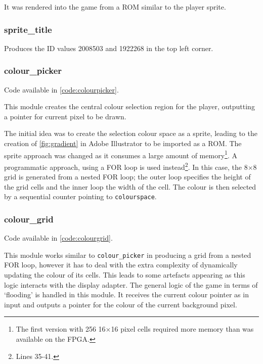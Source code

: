 It was rendered into the game from a ROM similar to the player sprite.

\subsubsection{sprite\_title}
Produces the ID values 2008503 and 1922268 in the top left corner. 

\subsubsection{colour\_picker}\label{sec:colourpicker}

Code available in \cref{code:colourpicker}.

This module creates the central colour selection region for the player, outputting 
a pointer for current pixel to be drawn.  

The initial idea was to create the selection colour space as a sprite, leading 
to the creation of \cref{fig:gradient} in Adobe Illustrator to be imported as a ROM. 
The sprite approach was changed as it consumes a large amount of memory\footnote{
    The first version with 256 16$\times$16 pixel cells required more memory than was available on the FPGA. 
}. 
A programmatic approach, using a FOR loop is used instead\footnote{
    Lines 35-41.
}. In this case, the 8$\times$8 grid is generated from a nested FOR loop; the 
outer loop specifies the height of the grid cells and the inner loop the width 
of the cell. The colour is then selected by a sequential counter 
pointing to \lstinline|colourspace|.

\subsubsection{colour\_grid}\label{sec:colorgrid}
Code available in \cref{code:colourgrid}.

This module works similar to \lstinline|colour_picker| 
in producing a grid from a nested FOR loop,
however it has to deal with the extra complexity 
of dynamically updating the colour of its cells.
This leads to some artefacts appearing as this logic 
interacts with the display adapter. The general logic of the game in terms of 
`flooding' is handled in this module. It receives the current colour pointer 
as in input and outputs a pointer for the colour of the current background 
pixel. 

